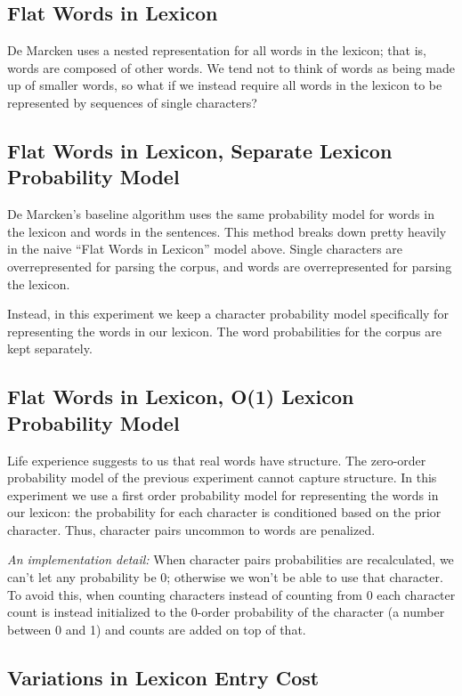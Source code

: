 \documentclass[11pt, oneside, fleqn]{article}
\begin{document}
  \subsection{Flat Words in Lexicon}
  
  De Marcken uses a nested representation for all words in the lexicon; that is, words are composed of other words. We tend not to think of words as being made up of smaller words, so what if we instead require all words in the lexicon to be represented by sequences of single characters?

  \subsection{Flat Words in Lexicon, Separate Lexicon Probability Model}

	De Marcken's baseline algorithm uses the same probability model for words in the lexicon and words in the sentences. This method breaks down pretty heavily in the naive ``Flat Words in Lexicon'' model above. Single characters are overrepresented for parsing the corpus, and words are overrepresented for parsing the lexicon.
	
	Instead, in this experiment we keep a character probability model specifically for representing the words in our lexicon. The word probabilities for the corpus are kept separately.

  \subsection{Flat Words in Lexicon, O(1) Lexicon Probability Model}

	Life experience suggests to us that real words have structure. The zero-order probability model of the previous experiment cannot capture structure. In this experiment we use a first order probability model for representing the words in our lexicon: the probability for each character is conditioned based on the prior character. Thus, character pairs uncommon to words are penalized.
	
	\textit{An implementation detail:} When character pairs probabilities are recalculated, we can't let any probability be 0; otherwise we won't be able to use that character. To avoid this, when counting characters instead of counting from 0 each character count is instead initialized to the 0-order probability of the character (a number between 0 and 1) and counts are added on top of that.

	\subsection{Variations in Lexicon Entry Cost}
	
\end{document}
